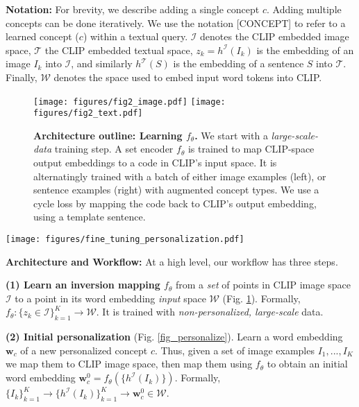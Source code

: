 \documentclass[runningheads]{llncs}
\newcommand{\figref}[1]{Fig. \ref{#1}}
\renewcommand\vec[1]{\mathbf{#1}}
\newcommand{\ftheta}{f_\theta}
\newcommand{\w}{\vec{w}}
\newcommand{\W}{\mathcal{W}}
\newcommand{\I}{\mathcal{I}}
\newcommand{\T}{\mathcal{T}}
\newcommand{\CLIPI}{h^{\mathcal{I}}}
\newcommand{\CLIPT}{h^{\mathcal{T}}}
\newcommand{\img}{I}
\newcommand{\concept}{[CONCEPT]}
\begin{document}
\noindent\textbf{Notation:}
For brevity, we describe adding a single concept $c$. Adding multiple concepts can be  done iteratively. We use the notation \concept{}  to refer to a learned concept ($c$) within a textual query. $\I$ denotes the CLIP embedded image space, $\T$ the CLIP embedded textual space, $z_k = \CLIPI(\img_k)$ is the embedding of an image $\img_k$ into $\I$, and similarly $\CLIPT(S)$ is the embedding of a sentence $S$ into $\T$. Finally, $\W$ denotes the space used to embed input word tokens into CLIP.

\begin{figure}[h]
    \centering
    \texttt{[image: figures/fig2\_image.pdf]} \texttt{[image: figures/fig2\_text.pdf]} \caption{\textbf{Architecture outline: Learning $\ftheta$.} We start with a \textit{large-scale-data} training step. A set encoder $\ftheta$ is trained to map CLIP-space output embeddings to a code in CLIP's input space. It is alternatingly trained with a batch of either image examples (left), or sentence examples (right) with augmented concept types. We use a cycle loss by mapping the code back to CLIP's output embedding, using a template sentence.}\label{fig_ftheta}
\end{figure}


\begin{SCfigure}
    \centering
    \texttt{[image: figures/fine\_tuning\_personalization.pdf]} \caption{\textbf{Architecture outline: Personalization.}  Given a set of examples of a personalized concept and its type (skirt), we embed them with CLIP and predict an initial code ($\w_0$) for the concept using a frozen $\ftheta$. We then further tune the code with a contrastive loss.}
    \label{fig_personalize}
\end{SCfigure}


\noindent\textbf{Architecture and Workflow:}
At a high level, our workflow has three steps.  

\textbf{(1)  Learn an inversion mapping  $\ftheta$} from a \textit{set} of points in CLIP image space $\I$ to a point in its word embedding \textit{input} space $\W$ (\figref{fig_ftheta}).
Formally, $\ftheta: \{z_k \in \I\}^{K}_{k=1} \rightarrow \W$. It is trained with \textit{non-personalized, large-scale} data.

\textbf{(2) Initial personalization} (\figref{fig_personalize}). Learn a word embedding $\w_c$ of a new personalized concept $c$. Thus, given a set of image examples $\img_1,...,\img_K$ we map them to CLIP image space, then map them using $\ftheta$ to obtain an initial word embedding $\w_c^0=\ftheta(\{\CLIPI(\img_k)\})$.
Formally, $\{\img_k\}_{k=1}^K \rightarrow \{\CLIPI(\img_k)\}_{k=1}^K \rightarrow \w^0_c \in\W$.
\end{document}
